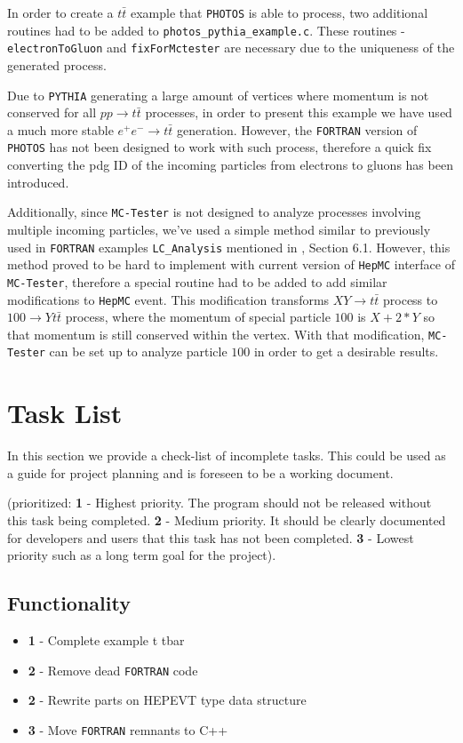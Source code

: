 \documentclass[]{Photos_interface_design}
\begin{document}
In order to create a $t \bar t$ example that {\tt PHOTOS} is able to process,
two additional routines had to be added to {\tt photos\_pythia\_example.c}.
These routines - {\tt electronToGluon} and {\tt fixForMctester} are necessary
due to the uniqueness of the generated process.

Due to {\tt PYTHIA} generating a large amount of vertices where momentum is not
conserved for all $p p \rightarrow t \bar t$ processes, in order to present this
example we have used a much more stable $e^+ e^- \rightarrow t \bar t$
generation. However, the {\tt FORTRAN} version of {\tt PHOTOS} has not been designed
to work with such process, therefore a quick fix converting the pdg ID of
the incoming particles from electrons to gluons has been introduced.

Additionally, since {\tt MC-Tester} is not designed to analyze processes involving
multiple incoming particles, we've used a simple method similar to previously
used in {\tt FORTRAN} examples {\tt LC\_Analysis} mentioned in \cite{Golonka:2002rz}, Section 6.1. However,
this method proved to be hard to implement with current version of {\tt HepMC}
interface of {\tt MC-Tester}, therefore a special routine had to be added
to add similar modifications to {\tt HepMC} event. This modification transforms
$X Y \rightarrow t \bar t$ process to $100 \rightarrow Y t \bar t$ process,
where the momentum of special particle $100$ is $X + 2*Y$ so that momentum is still
conserved within the vertex. With that modification, {\tt MC-Tester} can be set up
to analyze particle $100$ in order to get a desirable results.

\newpage

\section*{Task List}
In this section we provide a check-list of incomplete tasks.
This could be used as a guide for project planning and is foreseen
to be a working document. 

(prioritized: {\bf 1} - Highest priority. The program should not be
released without this task being completed. {\bf 2} - Medium priority.
It should be clearly documented for developers and users that this task has not
been completed. {\bf 3} - Lowest priority such as a long term goal 
for the project).

\subsection*{Functionality}
\begin{itemize}
  \item[\ding{111}]{\bf 1} - Complete example t tbar
  \item[\ding{111}]{\bf 2} - Remove dead {\tt FORTRAN} code
  \item[\ding{111}]{\bf 2} - Rewrite parts on HEPEVT type data structure
  \item[\ding{111}]{\bf 3} - Move {\tt FORTRAN} remnants to C++
\end{itemize}
\end{document}
